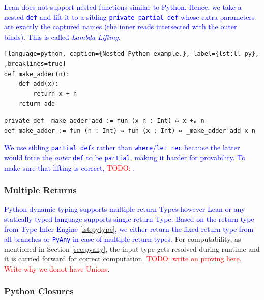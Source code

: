 \documentclass{article}
\newcommand{\code}{\lstinline}
\newcommand{\todo}[1]{\textcolor{red}{TODO: #1}}
\newcommand{\suggest}[1]{\textcolor{blue}{#1}}
\begin{document}
{\suggest{Lean does not support nested functions similar to Python. Hence, we take a nested \code{def} and lift it to a sibling \code{private partial def} whose extra parameters are exactly the captured names (the inner reads intersected with the outer binds). This is called \emph{Lambda Lifting}. }

\noindent
\begin{minipage}[t]{0.48\textwidth}
\begin{lstlisting}[language=python, caption={Nested Python example.}, label={lst:ll-py},  ,breaklines=true]
def make_adder(n): 
    def add(x): 
        return x + n 
    return add
\end{lstlisting}
\end{minipage}%
\hfill
\begin{minipage}[t]{0.48\textwidth}
\begin{lstlisting}[language=lean, caption={Lambda Lifted converted Lean code}, label={lst:ll-lean}, breaklines=true, mathescape=true]
private def _make_adder'add := fun (x n : Int) ↦ x +ₚ n
def make_adder := fun (n : Int) ↦ fun (x : Int) ↦ _make_adder'add x n
\end{lstlisting}
\end{minipage}


\suggest{We use sibling \code{partial def}s rather than \code{where}/\code{let rec} because the latter would force the \emph{outer} \code{def} to be \code{partial}, making it harder for provability. To make sure that lifting is correct, \todo{}.}

\subsubsection{Multiple Returns}

\suggest{Python dynamic typing supports multiple return Types however Lean or any statically typed language supports single return Type. Based on the return type from Type Infer Engine \ref{lst:pytype}, we either return the fixed return type from all branches or \code{PyAny} in case of multiple return types.} For computability, as mentioned in Section \ref{sec:pyany}, the input type gets resolved during runtime and it is carried forward for correct computation. \todo{write on proving here. Write why we donot have Unions}.

\subsubsection{Python Closures}

}
\end{document}
